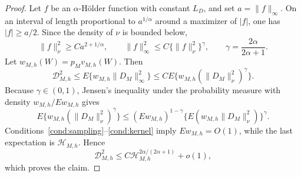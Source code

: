 \begin{proof}
Let \(f\) be an \(\alpha\)-H\"older function with constant \(L_D\), and set \(a=\|f\|_\infty\). On an interval of length proportional to \(a^{1/\alpha}\) around a maximizer of \(|f|\), one has \(|f|\ge a/2\). Since the density of \(\nu\) is bounded below,
\[
\|f\|_\nu^2\ge Ca^{2+1/\alpha},
\qquad
\|f\|_\infty^2
\le C\{\|f\|_\nu^2\}^{\gamma},
\qquad
\gamma=\frac{2\alpha}{2\alpha+1}.
\]
Let \(w_{M,h}(W)=p_Mv_{M,h}(W)\). Then
\[
\mathcal D_{M,h}^2
\le E\{w_{M,h}\|D_M\|_\infty^2\}
\le C E\{w_{M,h}(\|D_M\|_\nu^2)^\gamma\}.
\]
Because \(\gamma\in(0,1)\), Jensen's inequality under the probability measure with density \(w_{M,h}/Ew_{M,h}\) gives
\[
E\{w_{M,h}(\|D_M\|_\nu^2)^\gamma\}
\le
(Ew_{M,h})^{1-\gamma}
\{E(w_{M,h}\|D_M\|_\nu^2)\}^{\gamma}.
\]
Conditions~\ref{cond:sampling}--\ref{cond:kernel} imply \(Ew_{M,h}=O(1)\), while the last expectation is \(\mathcal H_{M,h}\). Hence
\[
\mathcal D_{M,h}^2
\le C\mathcal H_{M,h}^{2\alpha/(2\alpha+1)}+o(1),
\]
which proves the claim.
\end{proof}
